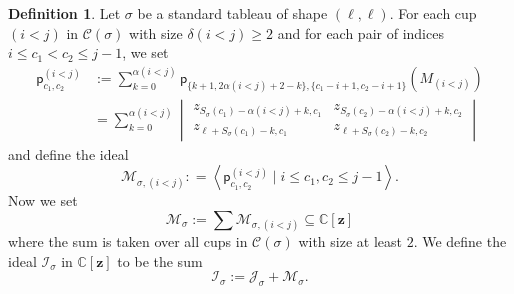 \documentclass[11pt]{amsart}
\theoremstyle{remark}
\theoremstyle{remark}
\theoremstyle{definition}
\theoremstyle{definition}
\theoremstyle{definition}
\newtheorem{definition}[theorem]{Definition}
\numberwithin{equation}{section}
\newcommand{\C}{\mathbb{C}}           %
\newcommand{\ga}{\alpha}
\newcommand{\gd}{\delta}
\newcommand{\gs}{\sigma}
\newcommand{\cc}{\mathcal{C}}
\newcommand{\ci}{\mathcal{I}}
\newcommand{\cj}{\mathcal{J}}
\newcommand{\cm}{\mathcal{M}}
\newcommand{\al}{\alpha}
\newcommand{\pl}{\mathsf{p}}
\newcommand{\cupsigma}{\cc(\gs)}
\newcommand{\isigma}{\ci_\gs}
\begin{document}
\begin{definition}\label{def:MSigma} Let $\gs$ be a standard tableau of shape $(\ell, \ell)$. For each cup $(i<j)$ in $\cupsigma$ with size $\gd(i<j)\geq 2$ and for each pair of indices $i\leq c_1<c_2 \leq j-1$, we set 
\begin{align*}
\pl_{c_1, c_2} ^{(i<j)} &:= \sum_{k=0}^{\ga(i<j)} \pl_{\{k+1, 2\ga(i<j)+2-k\}, \{c_1-i+1, c_2-i+1\}}(M_{(i<j)}) \\
& = \sum_{k=0}^{\al(i<j)} \begin{vmatrix}  z_{S_\gs(c_1) - \al(i<j) +k, c_1} &  z_{S_\gs(c_2) - \al(i<j) +k, c_2} \\ z_{\ell + S_\gs(c_1) -k , c_1} & z_{\ell + S_\gs(c_2)-k, c_2} \end{vmatrix}  
\end{align*}
and define the ideal
\[
\cm_{\gs,(i<j)}: = \left< \pl_{c_1,c_2}^{(i<j)} \mid i \leq c_1, c_2 \leq j-1  \right> .
\]  
Now we set
\[
\cm_\sigma:= \sum \cm_{\gs,(i<j)} \subseteq \C[\mathbf{z}]
\]
where the sum is taken over all cups in $\cupsigma$ with size at least $2$. 
We define the ideal $\ci_\gs$ in $\C[\mathbf{z}]$ to be the sum
\[
\isigma := \cj_{\gs} + \cm_\gs.
\]
\end{definition}
\end{document}
